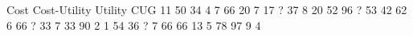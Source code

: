 Cost   Cost-Utility   Utility  CUG
11        50           34       4
 7        66           20       7
17        ?            37       8
20        52           96       ? 
53	  42           62       6
66        ?            33       7
33        90            2       1
54        36            ?       7
66        66           13       5
78        97            9       4
